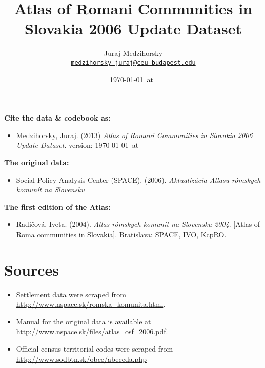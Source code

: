 \documentclass[11pt, a4paper]{article}
\title{Atlas of Romani Communities in Slovakia 2006 Update Dataset}
\author{
	Juraj Medzihorsky \\
	\href{mailto:medzihorsky_juraj@ceu-budapest.edu}{\texttt{medzihorsky\_juraj@ceu-budapest.edu}}
}
\date{\ddmmyyyydate\today~at~\currenttime}
\begin{document}
\maketitle

\noindent
\textbf{Cite the data \& codebook as:}

\begin{itemize}
	\item
Medzihorsky, Juraj. (2013) \textsl{Atlas of Romani Communities in Slovakia 2006 Update Dataset}. version: \ddmmyyyydate\today~at~\currenttime
\end{itemize}

\noindent
\textbf{The original data:}

\begin{itemize}
	\item
Social Policy Analysis Center (SPACE). (2006). \textsl{Aktualiz\'acia Atlasu r\'omskych komun\'it na Slovensku}
\end{itemize}



\noindent
\textbf{The first edition of the Atlas:}

\begin{itemize}
	\item
Radi\v{c}ov\'a, Iveta. (2004). \textsl{Atlas r\'omskych komun\'it na Slovensku 2004}. [Atlas of Roma communities in Slovakia]. Bratislava: SPACE, IVO, KcpRO.
\end{itemize}


\noindent


\tableofcontents


\section{Sources}

\begin{itemize}

	\item	Settlement data were scraped from \href{http://www.nspace.sk/romska_komunita.html}{http://www.nspace.sk/romska\_komunita.html}.

	\item 	Manual for the original data is available at \href{http://www.nspace.sk/files/atlas_osf_2006.pdf}{http://www.nspace.sk/files/atlas\_osf\_2006.pdf}.

	\item	Official census territorial codes were scraped from \href{http://www.sodbtn.sk/obce/abeceda.php}{http://www.sodbtn.sk/obce/abeceda.php}

\end{itemize}
\end{document}
